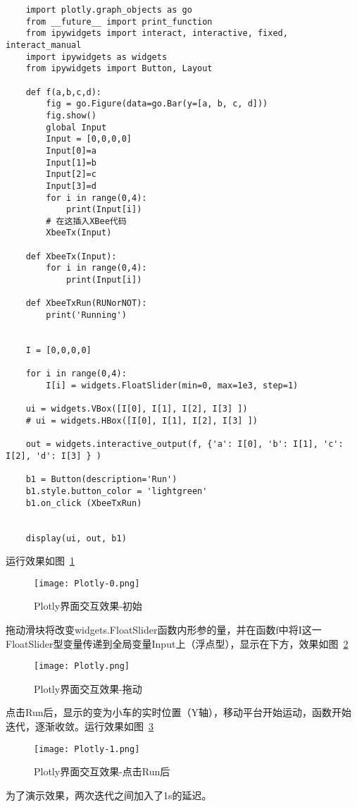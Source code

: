 \begin{verbatim}
    import plotly.graph_objects as go
    from __future__ import print_function
    from ipywidgets import interact, interactive, fixed, interact_manual
    import ipywidgets as widgets
    from ipywidgets import Button, Layout

    def f(a,b,c,d):
        fig = go.Figure(data=go.Bar(y=[a, b, c, d]))
        fig.show()
        global Input
        Input = [0,0,0,0]
        Input[0]=a
        Input[1]=b
        Input[2]=c
        Input[3]=d
        for i in range(0,4):
            print(Input[i])
        # 在这插入XBee代码
        XbeeTx(Input)
        
    def XbeeTx(Input):
        for i in range(0,4):
            print(Input[i])    

    def XbeeTxRun(RUNorNOT):
        print('Running')           
            
            
    I = [0,0,0,0]

    for i in range(0,4):
        I[i] = widgets.FloatSlider(min=0, max=1e3, step=1)

    ui = widgets.VBox([I[0], I[1], I[2], I[3] ])
    # ui = widgets.HBox([I[0], I[1], I[2], I[3] ])

    out = widgets.interactive_output(f, {'a': I[0], 'b': I[1], 'c': I[2], 'd': I[3] } )

    b1 = Button(description='Run')
    b1.style.button_color = 'lightgreen'
    b1.on_click (XbeeTxRun)


    display(ui, out, b1)
\end{verbatim}

运行效果如图~\ref{fig:Plotly-0}

\begin{figure}[htbp]
    \centering
    \texttt{[image: Plotly-0.png]}
    \caption{Plotly界面交互效果-初始}
    \label{fig:Plotly-0}
\end{figure}

拖动滑块将改变widgets.FloatSlider函数内形参的量，并在函数f中将I这一FloatSlider型变量传递到全局变量Input上（浮点型），显示在下方，效果如图~\ref{fig:Plotly}

\begin{figure}[htbp]
    \centering
    \texttt{[image: Plotly.png]}
    \caption{Plotly界面交互效果-拖动}
    \label{fig:Plotly}
\end{figure}

点击Run后，显示的变为小车的实时位置（Y轴），移动平台开始运动，函数开始迭代，逐渐收敛。运行效果如图~\ref{fig:Plotly-1}

\begin{figure}[htbp]
    \centering
    \texttt{[image: Plotly-1.png]}
    \caption{Plotly界面交互效果-点击Run后}
    \label{fig:Plotly-1}
\end{figure}

为了演示效果，两次迭代之间加入了1s的延迟。